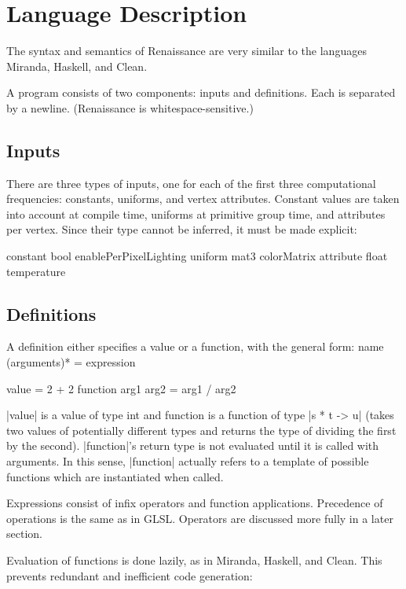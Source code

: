 \documentclass{acmsiggraph}               %
\begin{document}
\section{Language Description}

The syntax and semantics of Renaissance are very similar to the languages 
Miranda, Haskell, and Clean.

A program consists of two components: inputs and definitions.  Each is
separated by a newline.  (Renaissance is whitespace-sensitive.)


\subsection{Inputs}

There are three types of inputs, one for each of the first three
computational frequencies: constants, uniforms, and vertex attributes.
Constant values are taken into account at compile time, uniforms at
primitive group time, and attributes per vertex.  Since their type
cannot be inferred, it must be made explicit:

\begin{MyVerb}
constant bool enablePerPixelLighting
uniform mat3 colorMatrix
attribute float temperature
\end{MyVerb}

\subsection{Definitions}

A definition either specifies a value or a function, with the general form:
name (arguments)* = expression

\begin{MyVerb}
value = 2 + 2
function arg1 arg2 = arg1 / arg2
\end{MyVerb}

|value| is a value of type int and function is a function of type
|s * t -> u| (takes two values of potentially different types and returns
the type of dividing the first by the second).  |function|'s return
type is not evaluated until it is called with arguments.  In this
sense, |function| actually refers to a template of possible functions
which are instantiated when called.

Expressions consist of infix operators and function applications.
Precedence of operations is the same as in GLSL.  Operators are
discussed more fully in a later section.

Evaluation of functions is done lazily, as in Miranda, Haskell, and
Clean.  This prevents redundant and inefficient code generation:
\end{document}
